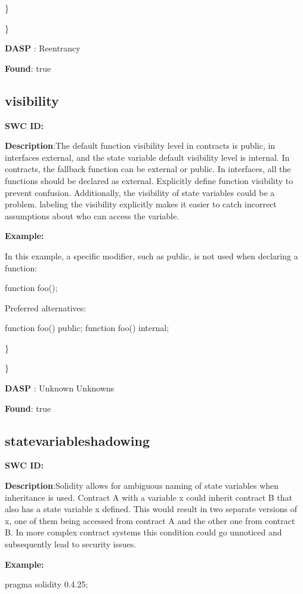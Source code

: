 \documentclass{article}
\begin{document}
\} 

\} 

\textbf{DASP} : Reentrancy

\textbf{Found}: true

\subsection{visibility} 
\textbf{SWC \textunderscore ID:} 

\textbf{Description}:The default function visibility level in contracts is public, in interfaces \textendash  external,  and the state variable default visibility level is internal. In contracts, the fallback function can be external or public. In interfaces, all the functions should be declared as external. Explicitly define function visibility to prevent confusion.
Additionally, the visibility of state variables could be a problem. labeling the visibility explicitly makes it easier to catch incorrect assumptions about who can access the variable.


\textbf{Example:} 

In this example, a specific modifier, such as public, is not used when declaring a function:

function foo();

Preferred alternatives:

function foo() public;
function foo() internal;

\} 

\} 

\textbf{DASP} : Unknown Unknowns

\textbf{Found}: true

\subsection{state\textunderscore variable\textunderscore shadowing} 
\textbf{SWC \textunderscore ID:} 

\textbf{Description}:Solidity allows for ambiguous naming of state variables when inheritance is used. Contract A with a variable x could inherit contract B that also has a state variable x defined. This would result in two separate versions of x, one of them being accessed from contract A and the other one from contract B. In more complex contract systems this condition could go unnoticed and subsequently lead to security issues.


\textbf{Example:} 

pragma solidity 0.4.25;
\end{document}

